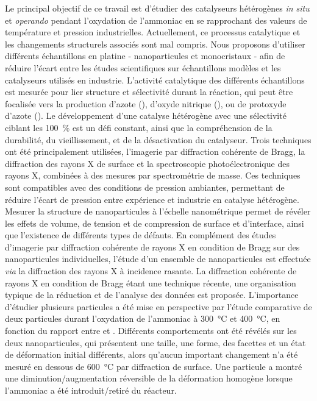 \begin{mdframed}[linecolor=Prune,linewidth=1]
\begin{multicols}{2}
Le principal objectif de ce travail est d'étudier des catalyseurs hétérogènes \textit{in situ} et \textit{operando} pendant l'oxydation de l'ammoniac en se rapprochant des valeurs de température et pression industrielles.
Actuellement, ce processus catalytique et les changements structurels associés sont mal compris.
Nous proposons d'utiliser différents échantillons en platine - nanoparticules et monocristaux - afin de réduire l'écart entre les études scientifiques sur échantillons modèles et les catalyseurs utilisés en industrie.
L'activité catalytique des différents échantillons est mesurée pour lier structure et sélectivité durant la réaction, qui peut être focalisée vers la production d'azote (), d'oxyde nitrique (), ou de protoxyde d'azote ().
Le développement d'une catalyse hétérogène avec une sélectivité ciblant les \qty{100}{\percent} est un défi constant, ainsi que la compréhension de la durabilité, du vieillissement, et de la désactivation du catalyseur.
Trois techniques ont été principalement utilisées, l'imagerie par diffraction cohérente de Bragg, la diffraction des rayons X de surface et la spectroscopie photoélectronique des rayons X, combinées à des mesures par spectrométrie de masse.
Ces techniques sont compatibles avec des conditions de pression ambiantes, permettant de réduire l'écart de pression entre expérience et industrie en catalyse hétérogène.
Mesurer la structure de nanoparticules à l'échelle nanométrique permet de révéler les effets de volume, de tension et de compression de surface et d'interface, ainsi que l'existence de différents types de défauts.
En complément des études d'imagerie par diffraction cohérente de rayons X en condition de Bragg sur des nanoparticules individuelles, l'étude d'un ensemble de nanoparticules est effectuée \textit{via} la diffraction des rayons X à incidence rasante.
La diffraction cohérente de rayons X en condition de Bragg étant une technique récente, une organisation typique de la réduction et de l'analyse des données est proposée.
L'importance d'étudier plusieurs particules a été mise en perspective par l'étude comparative de deux particules durant l'oxydation de l'ammoniac à \qty{300}{\degreeCelsius} et \qty{400}{\degreeCelsius}, en fonction du rapport entre  et .
Différents comportements ont été révélés sur les deux nanoparticules, qui présentent une taille, une forme, des facettes et un état de déformation initial différents, alors qu'aucun important changement n'a été mesuré en dessous de \qty{600}{\degreeCelsius} par diffraction de surface.
Une particule a montré une diminution/augmentation réversible de la déformation homogène lorsque l'ammoniac a été introduit/retiré du réacteur.

\end{multicols}
\end{mdframed}

